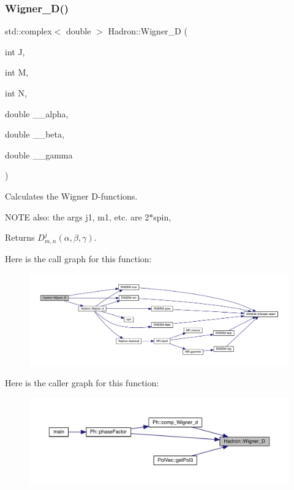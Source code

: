 \subsubsection{\texorpdfstring{Wigner\_D()}{Wigner\_D()}}
{\footnotesize\ttfamily std\+::complex$<$ double $>$ Hadron\+::\+Wigner\+\_\+D (\begin{DoxyParamCaption}\item[{int}]{J,  }\item[{int}]{M,  }\item[{int}]{N,  }\item[{double}]{\+\_\+\+\_\+alpha,  }\item[{double}]{\+\_\+\+\_\+beta,  }\item[{double}]{\+\_\+\+\_\+gamma }\end{DoxyParamCaption})}

Calculates the Wigner D-\/functions.

N\+O\+TE also\+: the args j1, m1, etc. are 2$\ast$spin,

\begin{DoxyReturn}{Returns}
$D^{j}_{m,n}(\alpha, \beta, \gamma)$. 
\end{DoxyReturn}
Here is the call graph for this function\+:
\nopagebreak
\begin{figure}[H]
\begin{center}
\leavevmode
\includegraphics[width=350pt]{d1/daf/namespaceHadron_a4d99a17c00bdddfc88a14c0571b74338_cgraph}
\end{center}
\end{figure}
Here is the caller graph for this function\+:
\nopagebreak
\begin{figure}[H]
\begin{center}
\leavevmode
\includegraphics[width=350pt]{d1/daf/namespaceHadron_a4d99a17c00bdddfc88a14c0571b74338_icgraph}
\end{center}
\end{figure}
\mbox{\label{namespaceHadron_aeadf04c31606521c48ee674d28e2ca3e}} 

